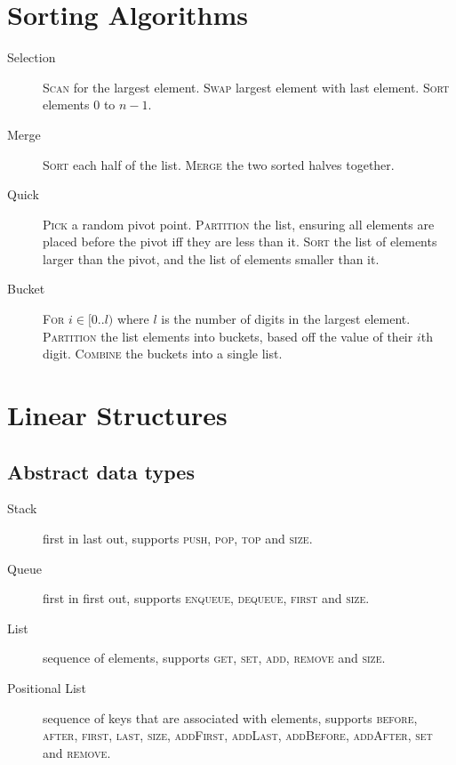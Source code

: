 \documentclass[landscape]{cheat}
\begin{document}
\begin{multicols}{3}
\section{Sorting Algorithms}
\begin{description}
    \item[Selection]
        \textsc{Scan} for the largest element.
        \textsc{Swap} largest element with last element.
        \textsc{Sort} elements 0 to $n-1$.
    \item[Merge]
        \textsc{Sort} each half of the list.
        \textsc{Merge} the two sorted halves together.
    \item[Quick]
        \textsc{Pick} a random pivot point.
        \textsc{Partition} the list, ensuring all elements are placed before the pivot iff they are less than it.
        \textsc{Sort} the list of elements larger than the pivot, and the list of elements smaller than it.
    \item[Bucket]
        \textsc{For} $i \in [0..l)$ where $l$ is the number of digits in the largest element.
        \textsc{Partition} the list elements into buckets, based off the value of their $i$th digit.
        \textsc{Combine} the buckets into a single list.
\end{description}

\section{Linear Structures}

\subsection{Abstract data types}
\begin{description}
    \item[Stack]
        first in last out,
        supports \textsc{push}, \textsc{pop}, \textsc{top} and \textsc{size}.
    \item[Queue]
        first in first out,
        supports \textsc{enqueue}, \textsc{dequeue}, \textsc{first} and \textsc{size}.
    \item[List]
        sequence of elements,
        supports \textsc{get}, \textsc{set}, \textsc{add}, \textsc{remove} and \textsc{size}.
    \item[Positional List]
        sequence of keys that are associated with elements,
        supports \textsc{before}, \textsc{after}, \textsc{first}, \textsc{last}, \textsc{size},
        \textsc{addFirst}, \textsc{addLast}, \textsc{addBefore}, \textsc{addAfter}, \textsc{set} and \textsc{remove}.
\end{description}


\end{multicols}
\end{document}

